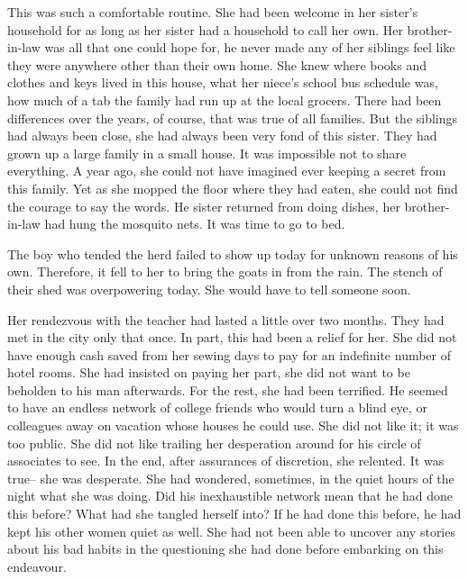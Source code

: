 \documentclass{article}
\begin{document}
This was such a comfortable routine. She had been welcome in her sister's household for as long as her sister had a household to call her own. Her brother-in-law was all that one could hope for, he never made any of her siblings feel like they were anywhere other than their own home. She knew where books and clothes and keys lived in this house, what her niece's school bus schedule was, how much of a tab the family had run up at the local grocers. There had been differences over the years, of course, that was true of all families. But the siblings had always been close, she had always been very fond of this sister. They had grown up a large family in a small house. It was impossible not to share everything. A year ago, she could not have imagined ever keeping a secret from this family. Yet as she mopped the floor where they had eaten, she could not find the courage to say the words. He sister returned from doing dishes, her brother-in-law had hung the mosquito nets. It was time to go to bed.

\vspace{.5cm}

The boy who tended the herd failed to show up today for unknown reasons of his own. Therefore, it fell to her to bring the goats in from the rain. The stench of their shed was overpowering today. She would have to tell someone soon.

Her rendezvous with the teacher had lasted a little over two months. They had met in the city only that once. In part, this had been a relief for her. She did not have enough cash saved from her sewing days to pay for an indefinite number of hotel rooms. She had insisted on paying her part, she did not want to be beholden to his man afterwards. For the rest, she had been terrified. He seemed to have an endless network of college friends who would turn a blind eye, or colleagues away on vacation whose houses he could use. She did not like it; it was too public. She did not like trailing her desperation around for his circle of associates to see. In the end, after assurances of discretion, she relented. It was true-- she was desperate.  She had wondered, sometimes, in the quiet hours of the night what she was doing. Did his inexhaustible network mean that he had done this before? What had she tangled herself into? If he had done this before, he had kept his other women quiet as well. She had not been able to uncover any stories about his bad habits in the questioning she had done before embarking on this endeavour.
\end{document}
